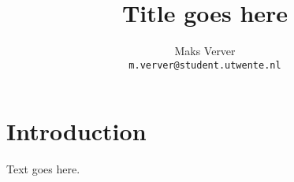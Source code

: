 \documentclass[11pt]{book}
\title{Title goes here}
\author{Maks Verver\\\texttt{m.verver@student.utwente.nl}}
\begin{document}
\maketitle

\section{Introduction}
Text goes here.



\end{document}
